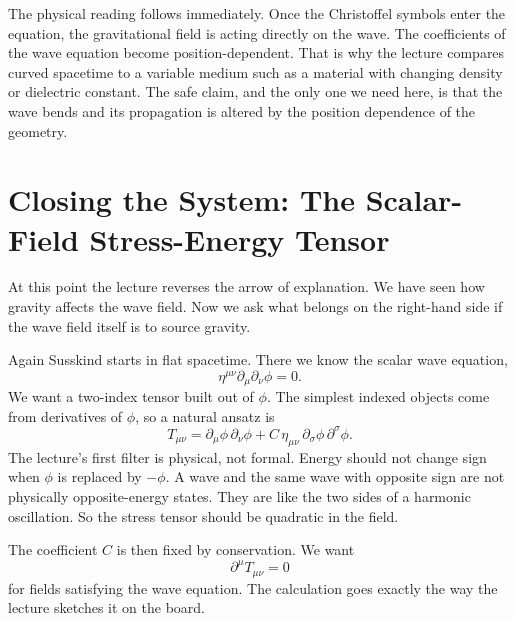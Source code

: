 The physical reading follows immediately. Once the Christoffel symbols enter the equation, the gravitational field is acting directly on the wave. The coefficients of the wave equation become position-dependent. That is why the lecture compares curved spacetime to a variable medium such as a material with changing density or dielectric constant. The safe claim, and the only one we need here, is that the wave bends and its propagation is altered by the position dependence of the geometry.

\section{Closing the System: The Scalar-Field Stress-Energy Tensor}

At this point the lecture reverses the arrow of explanation. We have seen how gravity affects the wave field. Now we ask what belongs on the right-hand side if the wave field itself is to source gravity.

Again Susskind starts in flat spacetime. There we know the scalar wave equation,
\begin{equation}
\eta^{\mu\nu}\partial_\mu\partial_\nu\phi=0.
\end{equation}
We want a two-index tensor built out of \(\phi\). The simplest indexed objects come from derivatives of \(\phi\), so a natural ansatz is
\begin{equation}
T_{\mu\nu}
=
\partial_\mu\phi\,\partial_\nu\phi
+
C\,\eta_{\mu\nu}\,\partial_\sigma\phi\,\partial^\sigma\phi.
\end{equation}
The lecture's first filter is physical, not formal. Energy should not change sign when \(\phi\) is replaced by \(-\phi\). A wave and the same wave with opposite sign are not physically opposite-energy states. They are like the two sides of a harmonic oscillation. So the stress tensor should be quadratic in the field.

The coefficient \(C\) is then fixed by conservation. We want
\begin{equation}
\partial^\mu T_{\mu\nu}=0
\end{equation}
for fields satisfying the wave equation. The calculation goes exactly the way the lecture sketches it on the board.

